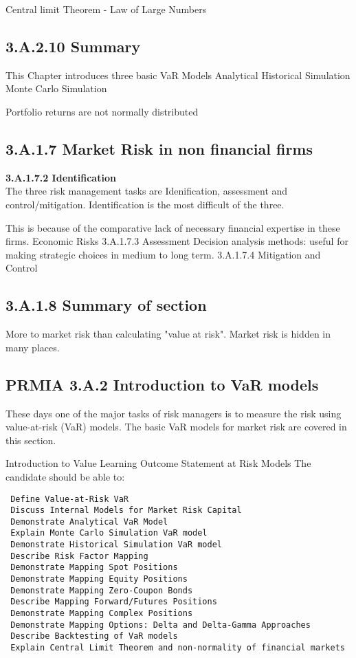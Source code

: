 \documentclass[]{report}
\begin{document}
Central limit Theorem - Law of Large Numbers

\subsection{3.A.2.10 Summary}

This Chapter introduces three basic VaR Models
Analytical
Historical Simulation
Monte Carlo Simulation

Portfolio returns are not normally distributed


\subsection*{3.A.1.7 Market Risk in non financial firms}
\textbf{ 3.A.1.7.2 Identification}\\
 The three risk management tasks are Idenification, assessment and control/mitigation. Identification is the most difficult of the three.
  
 This is because of the comparative lack of necessary financial expertise in these firms.
 Economic Risks
 3.A.1.7.3 Assessment
 Decision analysis methods: useful for making strategic choices in medium to long term.
 3.A.1.7.4 Mitigation and Control
\subsection{3.A.1.8 Summary of section}
  
 More to market risk than calculating "value at risk".
 Market risk is hidden in many places.
  
  
 
\subsection{PRMIA 3.A.2 Introduction to VaR models}
These days one of the major tasks of risk managers is to measure the risk using value-at-risk (VaR) models. The basic VaR models for market risk are covered in this section.

Introduction to Value Learning Outcome Statement at Risk Models
The candidate should be able to:
\begin{verbatim}
 Define Value-at-Risk VaR
 Discuss Internal Models for Market Risk Capital
 Demonstrate Analytical VaR Model
 Explain Monte Carlo Simulation VaR model
 Demonstrate Historical Simulation VaR model
 Describe Risk Factor Mapping
 Demonstrate Mapping Spot Positions
 Demonstrate Mapping Equity Positions
 Demonstrate Mapping Zero-Coupon Bonds
 Describe Mapping Forward/Futures Positions
 Demonstrate Mapping Complex Positions
 Demonstrate Mapping Options: Delta and Delta-Gamma Approaches
 Describe Backtesting of VaR models
 Explain Central Limit Theorem and non-normality of financial markets
\end{verbatim}
\end{document}
